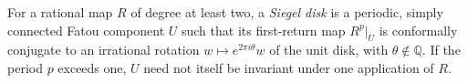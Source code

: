 
For a rational map $R$ of degree at least two, a \emph{Siegel disk} is a periodic, simply connected Fatou component $U$ such that its first-return map $R^p|_U$ is conformally conjugate to an irrational rotation $w\mapsto e^{2\pi i\theta}w$ of the unit disk, with $\theta\notin\mathbb Q$. If the period $p$ exceeds one, $U$ need not itself be invariant under one application of $R$.
